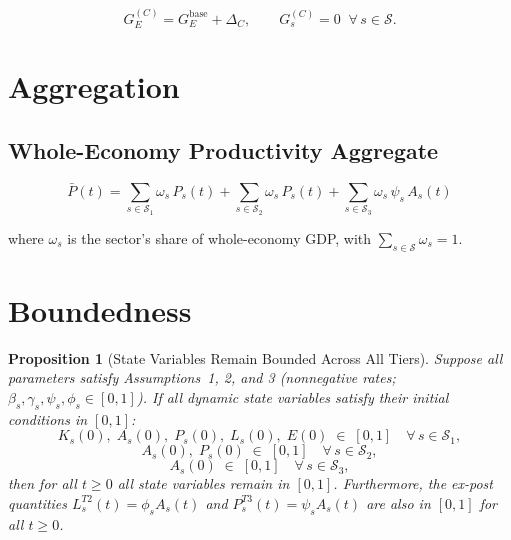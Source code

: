 \documentclass[11pt,a4paper]{article}
\newtheorem{proposition}{Proposition}
\begin{document}
\begin{equation}
G_E^{(C)} = G_E^{\text{base}} + \Delta_C, \qquad G_s^{(C)} = 0\;\; \forall\, s \in \mathcal{S}.
\label{eq:scenC}
\end{equation}

\section{Aggregation}
\label{sec:aggregation}

\subsection{Whole-Economy Productivity Aggregate}

\begin{equation}
\bar{P}(t)
= \sum_{s \in \mathcal{S}_1} \omega_s\, P_s(t)
+ \sum_{s \in \mathcal{S}_2} \omega_s\, P_s(t)
+ \sum_{s \in \mathcal{S}_3} \omega_s\, \psi_s\, A_s(t)
\label{eq:Ptotal}
\end{equation}

where $\omega_s$ is the sector's share of whole-economy GDP, with $\sum_{s \in \mathcal{S}} \omega_s = 1$.

\section{Boundedness}
\label{sec:boundedness}

\begin{proposition}[State Variables Remain Bounded Across All Tiers]
\label{prop:boundedness_all}
Suppose all parameters satisfy Assumptions~1, 2, and 3 (nonnegative rates; $\beta_s, \gamma_s, \psi_s, \phi_s \in [0,1]$). If all dynamic state variables satisfy their initial conditions in $[0,1]$:
\[
K_s(0),\; A_s(0),\; P_s(0),\; L_s(0),\; E(0) \;\in\; [0,1] \quad \forall\, s \in \mathcal{S}_1,
\]
\[
A_s(0),\; P_s(0) \;\in\; [0,1] \quad \forall\, s \in \mathcal{S}_2,
\]
\[
A_s(0) \;\in\; [0,1] \quad \forall\, s \in \mathcal{S}_3,
\]
then for all $t \geq 0$ all state variables remain in $[0,1]$. Furthermore, the ex-post quantities $L_s^{T2}(t) = \phi_s A_s(t)$ and $P_s^{T3}(t) = \psi_s A_s(t)$ are also in $[0,1]$ for all $t \geq 0$.
\end{proposition}
\end{document}
